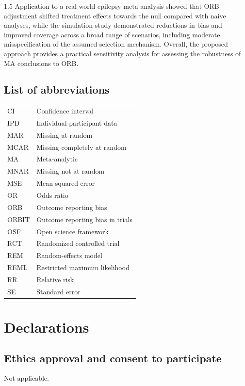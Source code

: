 \documentclass{article}
\begin{document}
\begin{spacing}{1.5}
Application to a real-world epilepsy meta-analysis showed that ORB-adjustment shifted treatment effects towards the null compared with naive analyses, while the simulation study demonstrated reductions in bias and improved coverage across a broad range of scenarios, including moderate misspecification of the assumed selection mechanism. Overall, the proposed approach provides a practical sensitivity analysis for assessing the robustness of MA conclusions to ORB.

\subsection*{List of abbreviations}

\begin{table}[H]
\begin{tabular}{ll}
CI    & Confidence interval              \\
IPD   & Individual participant data      \\
MAR   & Missing at random                \\
MCAR  & Missing completely at random     \\
MA    & Meta-analytic                    \\
MNAR  & Missing not at random            \\
MSE   & Mean squared error               \\
OR    & Odds ratio                       \\
ORB   & Outcome reporting bias           \\
ORBIT & Outcome reporting bias in trials \\
OSF   & Open science framework           \\
RCT   & Randomized controlled trial      \\
REM   & Random-effects model             \\
REML & Restricted maximum likelihood     \\
RR    & Relative risk                    \\
SE    & Standard error                  
\end{tabular}
\end{table}

\section*{Declarations}

\subsection*{Ethics approval and consent to participate}
Not applicable.


\end{spacing}
\end{document}
